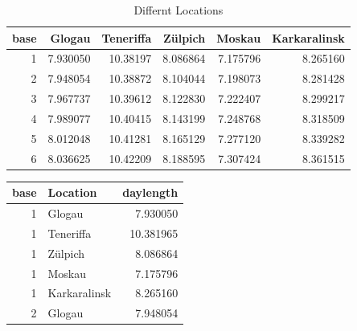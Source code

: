 \documentclass[
]{book}
\newenvironment{Shaded}{\begin{snugshade}}{\end{snugshade}}
\newcommand{\CommentTok}[1]{\textcolor[rgb]{0.56,0.35,0.01}{\textit{#1}}}
\newcommand{\DataTypeTok}[1]{\textcolor[rgb]{0.13,0.29,0.53}{#1}}
\newcommand{\DecValTok}[1]{\textcolor[rgb]{0.00,0.00,0.81}{#1}}
\newcommand{\KeywordTok}[1]{\textcolor[rgb]{0.13,0.29,0.53}{\textbf{#1}}}
\newcommand{\NormalTok}[1]{#1}
\newcommand{\OperatorTok}[1]{\textcolor[rgb]{0.81,0.36,0.00}{\textbf{#1}}}
\newcommand{\StringTok}[1]{\textcolor[rgb]{0.31,0.60,0.02}{#1}}
\begin{document}
\begin{table}

\caption{\label{tab:unnamed-chunk-14}Differnt Locations}
\fontsize{10}{12}\selectfont
\begin{tabular}[t]{r|r|r|r|r|r}
\hline
base & Glogau & Teneriffa & Zülpich & Moskau & Karkaralinsk\\
\hline
1 & 7.930050 & 10.38197 & 8.086864 & 7.175796 & 8.265160\\
\hline
2 & 7.948054 & 10.38872 & 8.104044 & 7.198073 & 8.281428\\
\hline
3 & 7.967737 & 10.39612 & 8.122830 & 7.222407 & 8.299217\\
\hline
4 & 7.989077 & 10.40415 & 8.143199 & 7.248768 & 8.318509\\
\hline
5 & 8.012048 & 10.41281 & 8.165129 & 7.277120 & 8.339282\\
\hline
6 & 8.036625 & 10.42209 & 8.188595 & 7.307424 & 8.361515\\
\hline
\end{tabular}
\end{table}

\begin{Shaded}
\end{Shaded}

\begingroup\fontsize{10}{12}\selectfont

\begin{tabular}{r|l|r}
\hline
base & Location & daylength\\
\hline
1 & Glogau & 7.930050\\
\hline
1 & Teneriffa & 10.381965\\
\hline
1 & Zülpich & 8.086864\\
\hline
1 & Moskau & 7.175796\\
\hline
1 & Karkaralinsk & 8.265160\\
\hline
2 & Glogau & 7.948054\\
\hline
\end{tabular}
\endgroup{}
\end{document}

